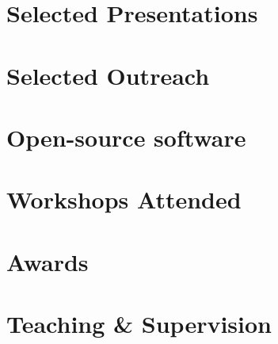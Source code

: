 \documentclass[12pt, letterpaper]{hunt-cv}
\begin{document}



\section*{Selected Presentations}


\section*{Selected Outreach}


\section*{Open-source software \href{\cvGitHubLink}{\faGithub}}


\section*{Workshops Attended}


\section*{Awards}


\section*{Teaching \& Supervision}

\end{document}
